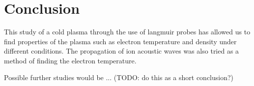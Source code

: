 \section{Conclusion}
This study of a cold plasma through the use of langmuir probes has allowed us to find properties of the plasma such as electron temperature and density under different conditions. The propagation of ion acoustic waves was also tried as a method of finding the electron temperature.

Possible further studies would be ... (TODO: do this as a short conclusion?)